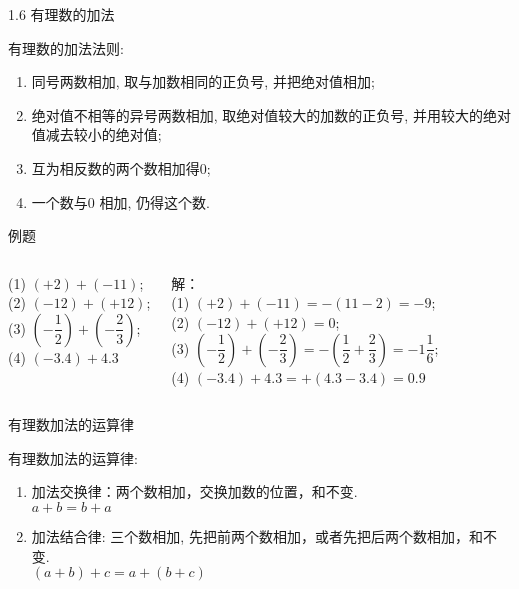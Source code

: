 \begin{frame}[t]{1.6 有理数的加法}
\begin{spacing}{2} %
有理数的加法法则:\\
\begin{enumerate}[label={\arabic*.}]
\item 同号两数相加, 取与加数相同的正负号, 并把绝对值相加;
\item 绝对值不相等的异号两数相加, 取绝对值较大的加数的正负号, 并用较大的绝对值减去较小的绝对值;
\item 互为相反数的两个数相加得0;
\item 一个数与0 相加, 仍得这个数.
\end{enumerate}
\end{spacing}
\end{frame}

\begin{frame}[t]{例题}
\begin{columns}
\begin{spacing}{2} %
(1) $(+2) + (-11)$; \\
(2) $(-12) + (+12)$;\\
\vspace{6pt}
(3) $\left(-\dfrac{1}{2}\right)+\left(-\dfrac{2}{3}\right) $; \\
\vspace{6pt}
(4) $(-3.4)+4.3$
\end{spacing}
\pause
{}
\begin{spacing}{2} %
解：\\
(1) $(+2) + (-11) = -(11-2) = -9$; \\
(2) $(-12) + (+12) = 0$;\\
\vspace{6pt}
(3) $\left(-\dfrac{1}{2}\right)+\left(-\dfrac{2}{3}\right) = -\left(\dfrac{1}{2} + \dfrac{2}{3}\right) = -1\dfrac{1}{6}$; \\
\vspace{6pt}
(4) $(-3.4)+4.3 = +(4.3 - 3.4) = 0.9$
\end{spacing}
\end{columns}
\end{frame}

\begin{frame}[t]{有理数加法的运算律}
\begin{spacing}{2} %
有理数加法的运算律:\\
\begin{enumerate}[label={\arabic*.}]
\item 加法交换律：两个数相加，交换加数的位置，和不变. \\
$a + b = b + a$
\item 加法结合律: 三个数相加, 先把前两个数相加，或者先把后两个数相加，和不变. \\
$(a + b) + c = a + (b + c)$
\end{enumerate}
\end{spacing}
\end{frame}

